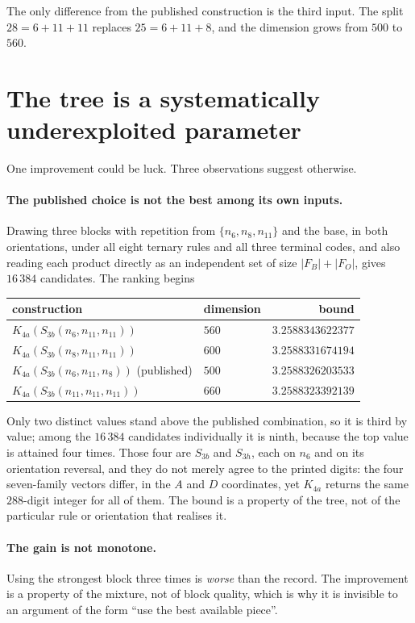 \documentclass[11pt]{article}
\theoremstyle{definition}
\begin{document}
The only difference from the published construction is the third input. The split
$28 = 6 + 11 + 11$ replaces $25 = 6 + 11 + 8$, and the dimension grows from $500$ to $560$.

\section{The tree is a systematically underexploited parameter}

One improvement could be luck. Three observations suggest otherwise.

\paragraph{The published choice is not the best among its own inputs.}
Drawing three blocks with repetition from $\{n_6, n_8, n_{11}\}$ and the base, in both
orientations, under all eight ternary rules and all three terminal codes, and also reading each
product directly as an independent set of size $|F_B| + |F_O|$, gives $16\,384$ candidates. The
ranking begins

\begin{center}
\begin{tabular}{llr}
\toprule
construction & dimension & bound \\
\midrule
$K_{4a}(S_{3b}(n_6, n_{11}, n_{11}))$ & $560$ & $3.2588343622377$ \\
$K_{4a}(S_{3b}(n_8, n_{11}, n_{11}))$ & $600$ & $3.2588331674194$ \\
$K_{4a}(S_{3b}(n_6, n_{11}, n_8))$ (published) & $500$ & $3.2588326203533$ \\
$K_{4a}(S_{3b}(n_{11}, n_{11}, n_{11}))$ & $660$ & $3.2588323392139$ \\
\bottomrule
\end{tabular}
\end{center}

Only two distinct values stand above the published combination, so it is third by value; among
the $16\,384$ candidates individually it is ninth, because the top value is attained four times.
Those four are $S_{3b}$ and $S_{3h}$, each on $n_6$ and on its orientation reversal, and they do not
merely agree to the printed digits: the four seven-family vectors differ, in the $A$ and $D$
coordinates, yet $K_{4a}$ returns the same $288$-digit integer for all of them. The bound is a
property of the tree, not of the particular rule or orientation that realises it.

\paragraph{The gain is not monotone.}
Using the strongest block three times is \emph{worse} than the record. The improvement is a
property of the mixture, not of block quality, which is why it is invisible to an argument of the
form ``use the best available piece''.
\end{document}
